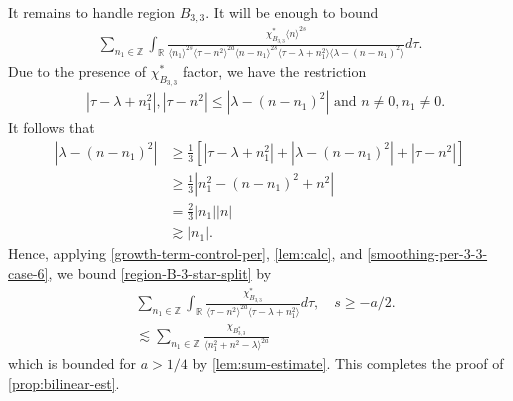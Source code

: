 \documentclass[12pt,reqno]{amsart}
\numberwithin{equation}{section}  %
\numberwithin{figure}{section}
\newcommand{\rr}{\mathbb{R}}
\newcommand{\zz}{\mathbb{Z}}
\theoremstyle{plain}
\theoremstyle{definition}
\theoremstyle{remark}
\begin{document}
%
%
It remains to handle region $B_{3,3}$. It will be enough to bound
%
%
\begin{equation}
  \label{region-B-3-star-split}
\begin{split}
   \sum_{n_{1} \in \zz} \int_{\rr} \frac{\chi^{*}_{B_{3,3}}
    \langle n \rangle ^{2s}
    }{ \langle n_{1} \rangle^{2s} \langle  \tau  - n^{2}
    \rangle ^{2a}  \langle
n-n_{1} \rangle ^{2s}  \langle  \tau - \lambda+n_{1}^{2}
\rangle \langle   \lambda  -(n - n_{1})^{2}
\rangle } d \tau.
\end{split}
\end{equation}
%
Due to the presence of $\chi^{*}_{B_{3,3}}$ factor, we have the restriction
%
%
\begin{equation*}
\begin{split}
& |\tau - \lambda +n_{1}^2|, | \tau - n^{2} | \le |  \lambda -
(n - n_{1})^{2} | \text{ and }  n \neq 0, n_1 \neq 0.
\end{split}
\end{equation*}
%
It follows that
\begin{equation}
  \label{smoothing-per-3-3-case-6}
\begin{split}
  | \lambda - (n - n_{1})^{2} |
  & \ge \frac{1}{3}\left[ | \tau - \lambda + n_{1}^{2} | + | \lambda - (n - n_{1})^{2}
  | + | \tau - n^{2} | \right]
  \\
  & \ge \frac{1}{3} |  n_{1}^{2} - (n - n_{1})^{2} + n^{2} |
  \\
  & = \frac{2}{3} | n_{1} | | n |
  \\
  & \gtrsim | n_{1} |.
\end{split}
\end{equation}
Hence, applying
\eqref{growth-term-control-per}, \autoref{lem:calc}, and
\eqref{smoothing-per-3-3-case-6}, we bound \eqref{region-B-3-star-split} by
%
%
\begin{equation*}
\begin{split}
   & \sum_{n_{1} \in \zz} \int_{\rr} \frac{\chi^{*}_{B_{3,3}}
    }{ \langle  \tau  - n^{2}
    \rangle ^{2a}   \langle  \tau - \lambda+n_{1}^{2}
\rangle } d \tau, \quad s \ge -a/2.
\\
& \lesssim  \sum_{n_{1} \in \zz} \frac{\chi_{B_{3,3}^{*}}}{\langle n_{1}^{2} +
n^{2} - \lambda \rangle^{2a }}
\end{split}
\end{equation*}
which is bounded for $a > 1/4$ by
\autoref{lem:sum-estimate}. This completes the proof of
\autoref{prop:bilinear-est}. \qquad \qedsymbol
%
%
\end{document}
